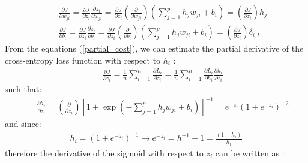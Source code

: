 \documentclass{article}
\begin{document}
\begin{eqnarray}
&&\frac{\partial{J}}{\partial{w_{ji}}} = \frac{\partial{J}}{\partial{z_{i}}} \frac{\partial{z_{i}}}{\partial{w_{ji}}}   =  \frac{\partial{J}}{\partial{z_i}} \left( \frac{\partial}{\partial{w_{ji}}}\right)\left(\sum_{j=1}^{p}h_{j}w_{ji}  + b_i\right) = \left(\frac{\partial{J}}{\partial{z_i}}\right) h_{j}
\nonumber \\
&&\frac{\partial{J}}{\partial{b_l}} = \frac{\partial{J}}{\partial{z_i}} \frac{\partial{z_i}}{\partial{b_l}}   =  \frac{\partial{J}}{\partial{z_i}} \left( \frac{\partial}{\partial{b_l}}\right)\left(\sum_{j=1}^{p}h_{j}w_{ji}  + b_i\right) = \left(\frac{\partial{J}}{\partial{z_i}}\right)\delta_{i,l}
\label{partial_cost}
\end{eqnarray}
From the equations (\ref{partial_cost}), we can estimate the partial derivative of the cross-entropy loss function with respect to $h_i$ :
\begin{eqnarray}
&&\frac{\partial{J}}{\partial{z_i}} =  \frac{1}{n}\sum_{i=1}^{n} \frac{\partial{L_i}}{\partial{z_i}}  = \frac{1}{n}\sum_{i=1}^{n} \frac{\partial{L_i}}{\partial{h_i}}\frac{\partial{h_i}}{\partial{z_i}} 
\label{costz}
\end{eqnarray}
such that:
\begin{eqnarray}
&&\frac{\partial{h_i}}{\partial{z_i}} = \left(\frac{\partial{}}{\partial{z_i}}\right)  \left[1+\exp(-\sum_{j=1}^{p}h_{j}w_{ji}  + b_i )\right]^{-1} = e^{-z_i}(1+e^{-z_i})^{-2} 
\end{eqnarray}
and since:
\begin{eqnarray}
h_i = (1+e^{-z_i}) ^{-1} \rightarrow e^{-z_i} = h^{-1} -1 = \frac{(1-h_i)}{h_i}
\end{eqnarray}
therefore the derivative of the sigmoid with respect to $z_i$ can be written as :
\end{document}
